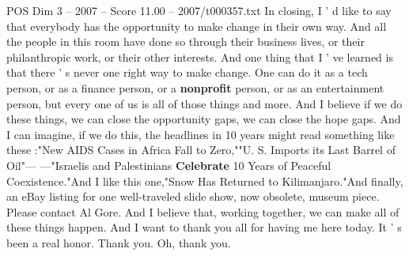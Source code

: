 \begin{textsample}{POS Dim 3 – 2007 – Score 11.00 – 2007/t000357.txt}
In closing, I ' d like to say that everybody has the opportunity to make change in their own way.
And all the people in this room have done so through their business lives, or their philanthropic work, or their other interests.
And one thing that I ' ve learned is that there ' s never one right way to make change.
One can do it as a tech person, or as a finance person, or a \textbf{nonprofit} person, or as an entertainment person, but every one of us is all of those things and more.
And I believe if we do these things, we can close the opportunity gaps, we can close the hope gaps.
And I can imagine, if we do this, the headlines in 10 years might read something like these :"New AIDS Cases in Africa Fall to Zero,""U.
S.
Imports its Last Barrel of Oil"— —"Israelis and Palestinians \textbf{Celebrate} 10 Years of Peaceful Coexistence."And I like this one,"Snow Has Returned to Kilimanjaro."And finally, an eBay listing for one well-traveled slide show, now obsolete, museum piece.
Please contact Al Gore.
And I believe that, working together, we can make all of these things happen.
And I want to thank you all for having me here today.
It ' s been a real honor.
Thank you.
Oh, thank you.

\end{textsample}

